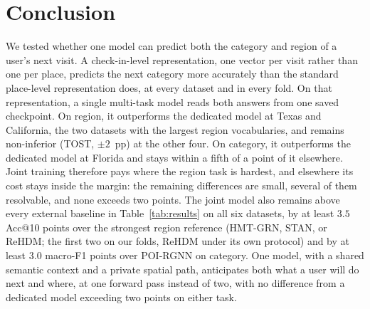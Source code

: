 \section{Conclusion}
\label{sec:conclusion}

We tested whether one model can predict both the category and region of a user's next visit. A check-in-level
representation, one vector per visit rather than one per place, predicts the next category more accurately than the standard
place-level representation does, at every dataset and in every fold. On that representation, a single multi-task model reads both answers from one saved checkpoint. On region, it outperforms the dedicated model at Texas and California, the two datasets with the largest region vocabularies, and remains non-inferior (TOST, $\pm2$~pp) at the other four. On category, it outperforms the dedicated model at Florida and stays within a fifth of a point of it elsewhere. Joint training therefore pays where the region task is hardest, and elsewhere its cost stays inside the margin: the remaining differences are small, several of them resolvable, and none exceeds two points. The joint model also remains above every external baseline in Table~\ref{tab:results} on all six datasets, by at least $3.5$ Acc@10 points over the strongest region reference (HMT-GRN, STAN, or ReHDM; the first two on our folds, ReHDM under its own protocol) and by at least $3.0$ macro-F1 points over POI-RGNN on category. One model, with a shared semantic context and a private spatial path, anticipates both what a user will do next and where, at one forward pass instead of two, with no difference from a dedicated model exceeding two points on either task.
